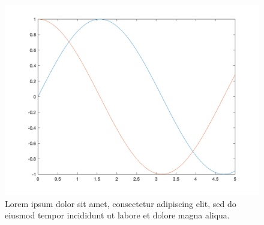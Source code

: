 \documentclass{article}
\begin{document}
    \begin{figure}[!htbp]
      \includegraphics[width = \textwidth]{./figures/figure.png}
      \caption{Lorem ipsum dolor sit amet, consectetur adipiscing elit, sed do eiusmod tempor incididunt ut labore et dolore magna aliqua.}
    \end{figure}

    \inputminted[breaklines]{matlab}{./build/code.m}
  
  
\end{document}
